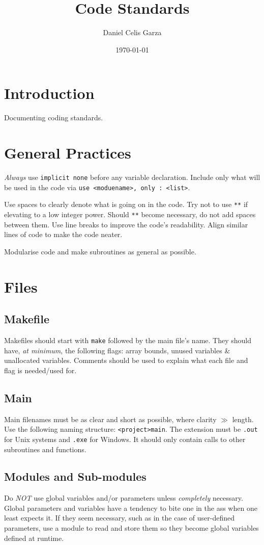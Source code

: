 \documentclass[11pt,a4paper]{article}
\title{Code Standards}
\author{Daniel Celis Garza}
\date{\today}
\begin{document}
	\maketitle
	\section{Introduction}
	Documenting coding standards.
	\section{General Practices}
	\emph{Always} use \texttt{implicit none} before any variable declaration. Include only what will be used in the code via \texttt{use <modue\textunderscore name>, only : <list>}.
	
	Use spaces to clearly denote what is going on in the code. Try not to use \texttt{**} if elevating to a low integer power. Should \texttt{**} become necessary, do not add spaces between them. Use line breaks to improve the code's readability. Align similar lines of code to make the code neater.
	
	Modularise code and make subroutines as general as possible.
	\section{Files}
		\subsection{Makefile}
			Makefiles should start with \texttt{make\textunderscore} followed by the main file's name. They should have, \emph{at minimum}, the following flags: array bounds, unused variables \& unallocated variables. Comments should be used to explain what each file and flag is needed/used for.
		\subsection{Main}
		Main filenames must be as clear and short as possible, where clarity $\gg$ length. Use the following naming structure: \texttt{<project>\textunderscore main}. The extension must be \texttt{.out} for Unix systems and \texttt{.exe} for Windows. It should only contain calls to other subroutines and functions.
		\subsection{Modules and Sub-modules}
		Do \emph{NOT} use global variables and/or parameters unless \emph{completely} necessary. Global parameters and variables have a tendency to bite one in the ass when one least expects it. If they seem necessary, such as in the case of user-defined parameters, use a module to read and store them so they become global variables defined at runtime.
		
\end{document}
